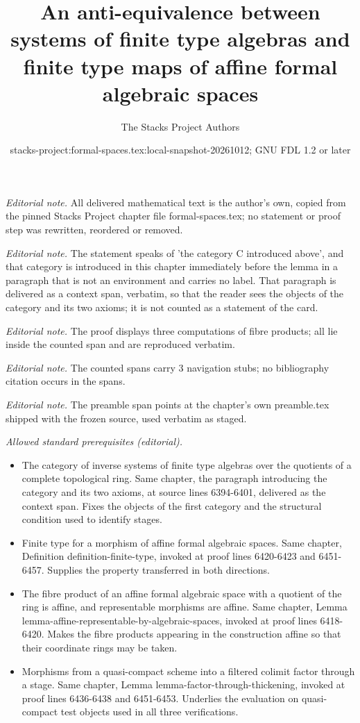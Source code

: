 \documentclass{stacks-project}
\title{An anti-equivalence between systems of finite type algebras and finite type maps of affine formal algebraic spaces}
\author{The Stacks Project Authors}
\date{stacks-project:formal-spaces.tex:local-snapshot-20261012; GNU FDL 1.2 or later}
\theoremstyle{plain}
\theoremstyle{definition}
\theoremstyle{remark}
\numberwithin{equation}{subsection}
\begin{document}
\maketitle
\noindent\textit{Editorial note.} All delivered mathematical text is the author's own, copied from the pinned Stacks Project chapter file formal-spaces.tex; no statement or proof step was rewritten, reordered or removed.\par\medskip
\noindent\textit{Editorial note.} The statement speaks of 'the category C introduced above', and that category is introduced in this chapter immediately before the lemma in a paragraph that is not an environment and carries no label. That paragraph is delivered as a context span, verbatim, so that the reader sees the objects of the category and its two axioms; it is not counted as a statement of the card.\par\medskip
\noindent\textit{Editorial note.} The proof displays three computations of fibre products; all lie inside the counted span and are reproduced verbatim.\par\medskip
\noindent\textit{Editorial note.} The counted spans carry 3 navigation stubs; no bibliography citation occurs in the spans.\par\medskip
\noindent\textit{Editorial note.} The preamble span points at the chapter's own preamble.tex shipped with the frozen source, used verbatim as staged.\par\medskip
\noindent\textit{Allowed standard prerequisites (editorial).}\begin{itemize}
\item The category of inverse systems of finite type algebras over the quotients of a complete topological ring. Same chapter, the paragraph introducing the category and its two axioms, at source lines 6394-6401, delivered as the context span. Fixes the objects of the first category and the structural condition used to identify stages.
\item Finite type for a morphism of affine formal algebraic spaces. Same chapter, Definition definition-finite-type, invoked at proof lines 6420-6423 and 6451-6457. Supplies the property transferred in both directions.
\item The fibre product of an affine formal algebraic space with a quotient of the ring is affine, and representable morphisms are affine. Same chapter, Lemma lemma-affine-representable-by-algebraic-spaces, invoked at proof lines 6418-6420. Makes the fibre products appearing in the construction affine so that their coordinate rings may be taken.
\item Morphisms from a quasi-compact scheme into a filtered colimit factor through a stage. Same chapter, Lemma lemma-factor-through-thickening, invoked at proof lines 6436-6438 and 6451-6453. Underlies the evaluation on quasi-compact test objects used in all three verifications.
\end{itemize}\medskip
\end{document}
